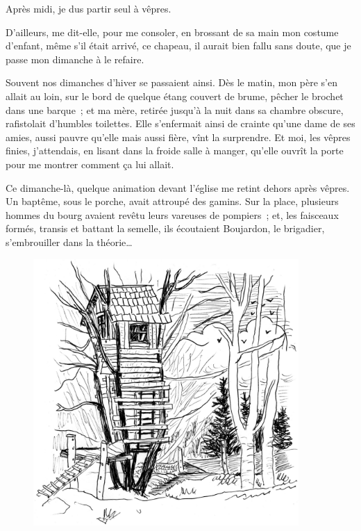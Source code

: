 \documentclass[petitlivre,chapnumsimple]{publivre}
\begin{document}
Après midi, je dus partir seul à vêpres.

D'ailleurs, me dit-elle, pour me consoler, en brossant de sa main mon costume d'enfant, même s'il était arrivé, ce chapeau, il aurait bien fallu sans doute, que je passe mon dimanche à le refaire.

Souvent nos dimanches d'hiver se passaient ainsi. Dès le matin, mon père s'en allait au loin, sur le bord de quelque étang couvert de brume, pêcher le brochet dans une barque ; et ma mère, retirée jusqu'à la nuit dans sa chambre obscure, rafistolait d'humbles toilettes. Elle s'enfermait ainsi de crainte qu'une dame de ses amies, aussi pauvre qu'elle mais aussi fière, vînt la surprendre. Et moi, les vêpres finies, j'attendais, en lisant dans la froide salle à manger, qu'elle ouvrît la porte pour me montrer comment ça lui allait.

Ce dimanche-là, quelque animation devant l'église me retint dehors après vêpres. Un baptême, sous le porche, avait attroupé des gamins. Sur la place, plusieurs hommes du bourg avaient revêtu leurs vareuses de pompiers ; et, les faisceaux formés, transis et battant la semelle, ils écoutaient Boujardon, le brigadier, s'embrouiller dans la théorie…

\begin{figure}[!p]
\includegraphics[width=0.9\textwidth]{cabane-dessin.jpg}
\end{figure}
\end{document}
